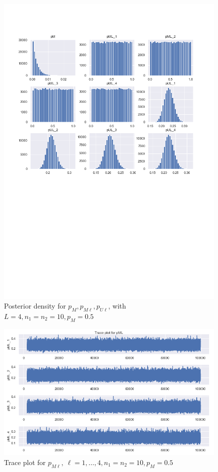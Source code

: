 \documentclass[11pt,reqno]{amsart}
\begin{document}
\newpage
\begin{figure}[h!]
   \centering
   \includegraphics[width=\textwidth]{../Figures/allParam_nM10_L4.png} %
   \caption{Posterior density for $p_M, p_{M\ell}, p_{U\ell}$, with $L=4, n_1=n_2 = 10, p_M = 0.5$}
   \label{fig:example}
\end{figure}
\begin{figure}[h!]
   \centering
   \includegraphics[width=\textwidth]{../Figures/traceML_nM10_L4.png} %
   \caption{Trace plot for $p_{M\ell}, \ \ell=1,\dots,4, n_1=n_2 = 10, p_M = 0.5$}
   \label{fig:example}
\end{figure}
\end{document}
